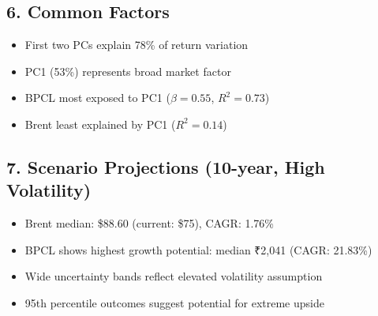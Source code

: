 \documentclass[11pt]{article}
\begin{document}
\subsection*{6. Common Factors}
\begin{itemize}
    \item First two PCs explain 78\% of return variation
    \item PC1 (53\%) represents broad market factor
    \item BPCL most exposed to PC1 ($\beta = 0.55$, $R^2 = 0.73$)
    \item Brent least explained by PC1 ($R^2 = 0.14$)
\end{itemize}

\subsection*{7. Scenario Projections (10-year, High Volatility)}
\begin{itemize}
    \item Brent median: \$88.60 (current: \$75), CAGR: 1.76\%
    \item BPCL shows highest growth potential: median ₹2,041 (CAGR: 21.83\%)
    \item Wide uncertainty bands reflect elevated volatility assumption
    \item 95th percentile outcomes suggest potential for extreme upside
\end{itemize}
\end{document}
